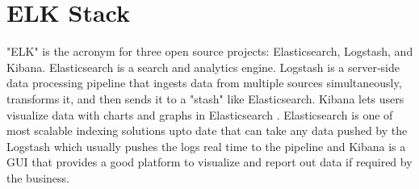 \section{ELK Stack}

"ELK" is the acronym for three open source projects: Elasticsearch, Logstash, 
and Kibana. Elasticsearch is a search and analytics engine. Logstash is a 
server‑side data processing pipeline that ingests data from multiple sources 
simultaneously, transforms it, and then sends it to a "stash" like 
Elasticsearch. Kibana lets users visualize data with charts and graphs in 
Elasticsearch \cite{ELKBlog}. Elasticsearch is one of most scalable indexing 
solutions upto date that can take any data pushed by the Logstash which 
usually pushes the logs real time to the pipeline and Kibana is a GUI that 
provides a good platform to visualize and report out data if required by the 
business.

